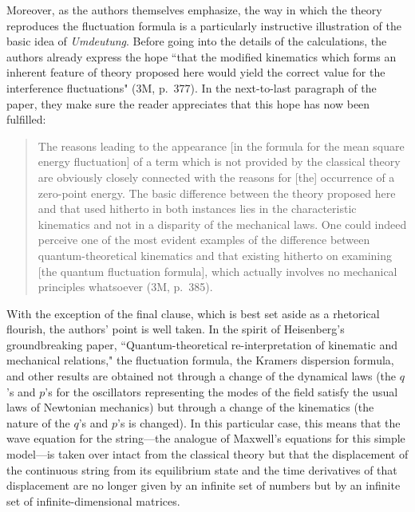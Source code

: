 \documentclass{elsart}
\begin{document}
Moreover, as the authors themselves emphasize, the way in which the theory reproduces the fluctuation formula is a particularly instructive illustration of the basic idea of {\it Umdeutung}. Before going into the details of the calculations, the authors already express the hope ``that the modified kinematics which forms an inherent feature of theory proposed here would yield the correct value for the interference fluctuations" (3M, p.\ 377). In the next-to-last paragraph of the paper, they make sure the reader appreciates that this hope has now been fulfilled:
\begin{quotation}
The reasons leading to the appearance [in the formula for the mean square energy fluctuation] of a term which is not provided by the classical theory are obviously closely connected with the reasons for [the] occurrence of a zero-point energy. The basic difference between the theory proposed here and that used hitherto in both instances lies in
the characteristic kinematics and not in a disparity of the mechanical laws. One could
indeed perceive one of the most evident examples of the difference between quantum-theoretical
kinematics and that existing hitherto on examining [the quantum fluctuation
formula], which actually involves no mechanical principles whatsoever (3M, p.\ 385).
\end{quotation}
With the exception of the final clause, which is best set aside as a rhetorical flourish, the authors' point is well taken. In the spirit of Heisenberg's groundbreaking paper, ``Quantum-theoretical re-interpretation of kinematic and mechanical relations," the fluctuation formula, the Kramers dispersion formula, and other results are obtained not through a change of the dynamical laws (the $q$'s and $p$'s for the oscillators representing the modes of the field satisfy the usual laws of Newtonian mechanics) but through a change of the kinematics (the nature of the $q$'s and $p$'s is changed).  In this particular case, this means that the wave equation for the string---the analogue of Maxwell's equations for this simple model---is taken over intact from the classical theory but that the displacement of the continuous string from its equilibrium state and the time derivatives of that displacement are no longer given by an infinite set of numbers but by an infinite set of infinite-dimensional matrices. 
\end{document}
